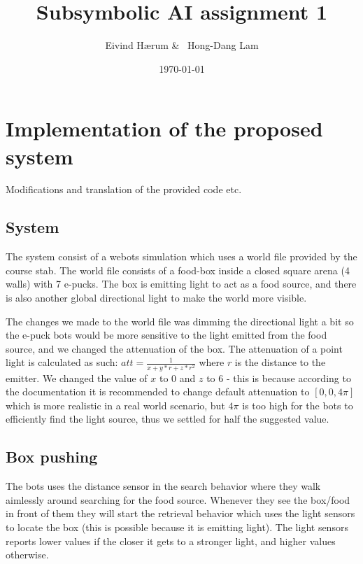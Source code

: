\documentclass[12pt, a4paper]{article}
\title{Subsymbolic AI assignment 1}
\author{Eivind Hærum \& \ Hong-Dang Lam}
\date{\today} %
\begin{document}
\maketitle
% 
% 
\newpage

\tableofcontents
{}
\newpage

\section{Implementation of the proposed system}
Modifications and translation of the provided code etc.

\subsection{System}
The system consist of a webots simulation which uses a world file provided by the course stab. The world file consists of a food-box inside a closed square arena (4 walls) with 7 e-pucks. The box is emitting light to act as a food source, and there is also another global directional light to make the world more visible.

The changes we made to the world file was dimming the directional light a bit so the e-puck bots would be more sensitive to the light emitted from the food source, and we changed the attenuation of the box. The attenuation of a point light is calculated as such: $ att = \frac{1}{x+y*r+z*r^2} $ where $r$ is the distance to the emitter. We changed the value of $x$ to 0 and $z$ to 6 - this is because according to the documentation it is recommended to change default attenuation to $[0,0,4\pi]$ which is more realistic in a real world scenario, but $4\pi$ is too high for the bots to efficiently find the light source, thus we settled for half the suggested value.  
\subsection{Box pushing}
The bots uses the distance sensor in the search behavior where they walk aimlessly around searching for the food source. Whenever they see the box/food in front of them they will start the retrieval behavior which uses the light sensors to locate the box (this is possible because it is emitting light). The light sensors reports lower values if the closer it gets to a stronger light, and higher values otherwise.
\end{document}
